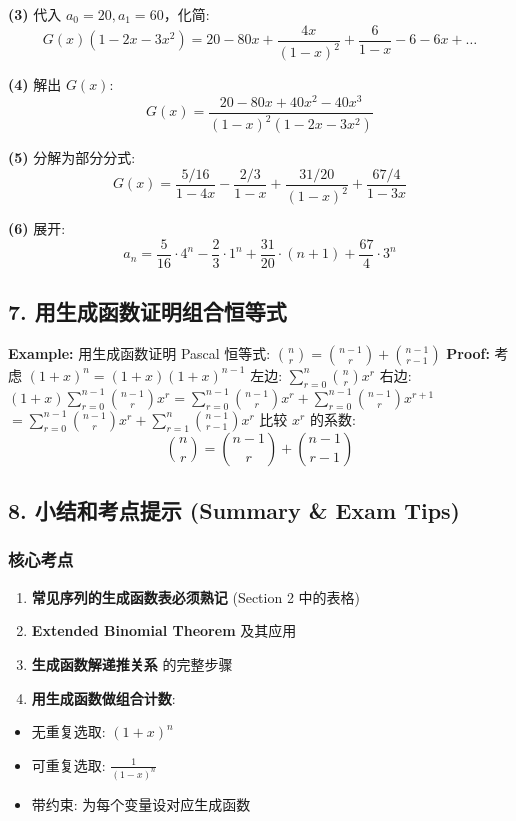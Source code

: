 \documentclass[10pt,a4paper,openany]{ctexbook}
\theoremstyle{definition}
\theoremstyle{remark}
\begin{document}
\textbf{(3)} 代入 $a_0 = 20, a_1 = 60$，化简:
\[
G(x)(1 - 2x - 3x^2) = 20 - 80x + \frac{4x}{(1-x)^2} + \frac{6}{1-x} - 6 - 6x + \dots
\]

\textbf{(4)} 解出 $G(x)$:
\[
G(x) = \frac{20 - 80x + 40x^2 - 40x^3}{(1-x)^2(1-2x-3x^2)}
\]

\textbf{(5)} 分解为部分分式:
\[
G(x) = \frac{5/16}{1-4x} - \frac{2/3}{1-x} + \frac{31/20}{(1-x)^2} + \frac{67/4}{1-3x}
\]

\textbf{(6)} 展开:
\[
a_n = \frac{5}{16} \cdot 4^n - \frac{2}{3} \cdot 1^n + \frac{31}{20} \cdot (n+1) + \frac{67}{4} \cdot 3^n
\]

\vspace{-2pt}

\subsection{7. 用生成函数证明组合恒等式}

\textbf{Example:} 用生成函数证明 Pascal 恒等式: $\binom{n}{r} = \binom{n-1}{r} + \binom{n-1}{r-1}$
\textbf{Proof:}
考虑 $(1+x)^n = (1+x)(1+x)^{n-1}$
左边: $\sum_{r=0}^n \binom{n}{r} x^r$
右边: $(1+x)\sum_{r=0}^{n-1} \binom{n-1}{r} x^r = \sum_{r=0}^{n-1} \binom{n-1}{r} x^r + \sum_{r=0}^{n-1} \binom{n-1}{r} x^{r+1}$
$= \sum_{r=0}^{n-1} \binom{n-1}{r} x^r + \sum_{r=1}^{n} \binom{n-1}{r-1} x^{r}$
比较 $x^r$ 的系数:
\[
\binom{n}{r} = \binom{n-1}{r} + \binom{n-1}{r-1}
\]

\vspace{-2pt}

\subsection{8. 小结和考点提示 (Summary \& Exam Tips)}

\subsubsection{核心考点}

\begin{enumerate}
\item \textbf{常见序列的生成函数表必须熟记} (Section 2 中的表格)
\item \textbf{Extended Binomial Theorem} 及其应用
\item \textbf{生成函数解递推关系} 的完整步骤
\item \textbf{用生成函数做组合计数}:
\end{enumerate}

\begin{itemize}
\item 无重复选取: $(1+x)^n$
\item 可重复选取: $\frac{1}{(1-x)^n}$
\item 带约束: 为每个变量设对应生成函数

\end{itemize}
\end{document}
